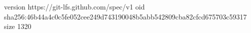 version https://git-lfs.github.com/spec/v1
oid sha256:46b44a4c0c5fe052cee249d743190048b5abb542809cba82cfcd675703c59317
size 1320
